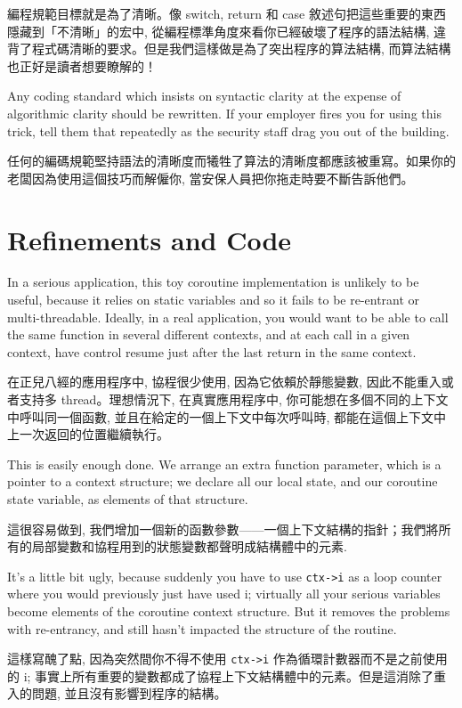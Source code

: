 \documentclass[12pt]{article}
\begin{document}
\begin{CJK}{UTF8}{bsmi}
編程規範目標就是為了清晰。像 switch, return 和 case 敘述句把這些重要的東西隱藏到「不清晰」的宏中, 從編程標準角度來看你已經破壞了程序的語法結構, 違背了程式碼清晰的要求。但是我們這樣做是為了突出程序的算法結構, 而算法結構也正好是讀者想要瞭解的！

Any coding standard which insists on syntactic clarity at the expense of algorithmic clarity should be rewritten. If your employer fires you for using this trick, tell them that repeatedly as the security staff drag you out of the building.

 任何的編碼規範堅持語法的清晰度而犧牲了算法的清晰度都應該被重寫。如果你的老闆因為使用這個技巧而解僱你, 當安保人員把你拖走時要不斷告訴他們。 
\section{Refinements and Code}

In a serious application, this toy coroutine implementation is unlikely to be useful, because it relies on static variables and so it fails to be re-entrant or multi-threadable. Ideally, in a real application, you would want to be able to call the same function in several different contexts, and at each call in a given context, have control resume just after the last return in the same context.

 在正兒八經的應用程序中, 協程很少使用, 因為它依賴於靜態變數, 因此不能重入或者支持多 thread。理想情況下, 在真實應用程序中, 你可能想在多個不同的上下文中呼叫同一個函數, 並且在給定的一個上下文中每次呼叫時, 都能在這個上下文中上一次返回的位置繼續執行。 

This is easily enough done. We arrange an extra function parameter, which is a pointer to a context structure; we declare all our local state, and our coroutine state variable, as elements of that structure.

 這很容易做到, 我們增加一個新的函數參數——一個上下文結構的指針；我們將所有的局部變數和協程用到的狀態變數都聲明成結構體中的元素. 

It's a little bit ugly, because suddenly you have to use \verb+ctx->i+ as a loop counter where you would previously just have used i; virtually all your serious variables become elements of the coroutine context structure. But it removes the problems with re-entrancy, and still hasn't impacted the structure of the routine.

這樣寫醜了點, 因為突然間你不得不使用 \verb+ctx->i+ 作為循環計數器而不是之前使用的 i;
事實上所有重要的變數都成了協程上下文結構體中的元素。但是這消除了重入的問題, 並且沒有影響到程序的結構。 


\end{CJK}
\end{document}
